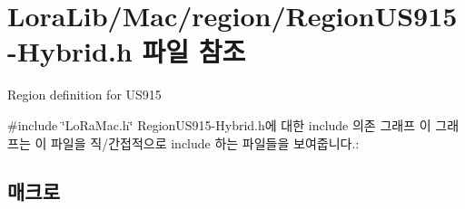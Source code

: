 \hypertarget{_region_u_s915-_hybrid_8h}{}\section{Lora\+Lib/\+Mac/region/\+Region\+U\+S915-\/\+Hybrid.h 파일 참조}
\label{_region_u_s915-_hybrid_8h}


Region definition for U\+S915  


{\ttfamily \#include \char`\"{}Lo\+Ra\+Mac.\+h\char`\"{}}\newline
Region\+U\+S915-\/\+Hybrid.h에 대한 include 의존 그래프
이 그래프는 이 파일을 직/간접적으로 include 하는 파일들을 보여줍니다.\+:
\subsection*{매크로}
